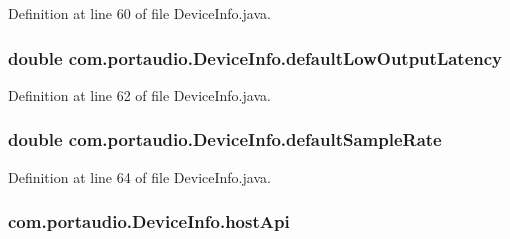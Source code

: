 Definition at line 60 of file Device\+Info.\+java.

\subsubsection[{\texorpdfstring{default\+Low\+Output\+Latency}{defaultLowOutputLatency}}]{\setlength{\rightskip}{0pt plus 5cm}double com.\+portaudio.\+Device\+Info.\+default\+Low\+Output\+Latency}\hypertarget{classcom_1_1portaudio_1_1_device_info_ac158722c527f2e16dbda940e0db6b2bf}{}\label{classcom_1_1portaudio_1_1_device_info_ac158722c527f2e16dbda940e0db6b2bf}


Definition at line 62 of file Device\+Info.\+java.

\subsubsection[{\texorpdfstring{default\+Sample\+Rate}{defaultSampleRate}}]{\setlength{\rightskip}{0pt plus 5cm}double com.\+portaudio.\+Device\+Info.\+default\+Sample\+Rate}\hypertarget{classcom_1_1portaudio_1_1_device_info_a3fd00524342f5eeeca0fff865bee32a1}{}\label{classcom_1_1portaudio_1_1_device_info_a3fd00524342f5eeeca0fff865bee32a1}


Definition at line 64 of file Device\+Info.\+java.

\subsubsection[{\texorpdfstring{host\+Api}{hostApi}}]{ com.\+portaudio.\+Device\+Info.\+host\+Api}\hypertarget{classcom_1_1portaudio_1_1_device_info_a45a4a2b175089e351e5e75b26c37e9ff}{}\label{classcom_1_1portaudio_1_1_device_info_a45a4a2b175089e351e5e75b26c37e9ff}


